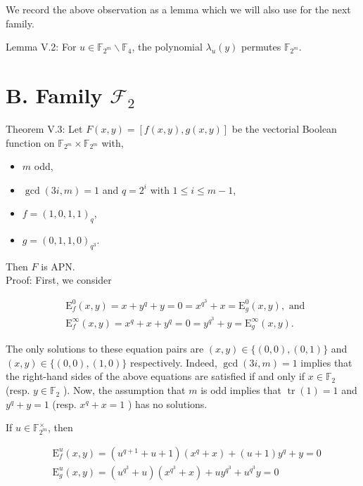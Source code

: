 \documentclass[10pt]{article}
\begin{document}
We record the above observation as a lemma which we will also use for the next family.

Lemma V.2: For $u \in \mathbb{F}_{2^{m}} \backslash \mathbb{F}_{4}$, the polynomial $\lambda_{u}(y)$ permutes $\mathbb{F}_{2^{m}}$.

\section*{B. Family $\mathcal{F}_{2}$}
Theorem V.3: Let $F(x, y)=[f(x, y), g(x, y)]$ be the vectorial Boolean function on $\mathbb{F}_{2^{m}} \times \mathbb{F}_{2^{m}}$ with,

\begin{itemize}
  \item $m$ odd,
  \item $\operatorname{gcd}(3 i, m)=1$ and $q=2^{i}$ with $1 \leq i \leq m-1$,
  \item $f=(1,0,1,1)_{q}$,
  \item $g=(0,1,1,0)_{q^{3}}$.
\end{itemize}

Then $F$ is APN.\\
Proof: First, we consider

$$
\begin{aligned}
& \mathrm{E}_{f}^{0}(x, y)=x+y^{q}+y=0=x^{q^{3}}+x=\mathrm{E}_{g}^{0}(x, y), \text { and } \\
& \mathrm{E}_{f}^{\infty}(x, y)=x^{q}+x+y^{q}=0=y^{q^{3}}+y=\mathrm{E}_{g}^{\infty}(x, y) .
\end{aligned}
$$

The only solutions to these equation pairs are $(x, y) \in \{(0,0),(0,1)\}$ and $(x, y) \in\{(0,0),(1,0)\}$ respectively. Indeed, $\operatorname{gcd}(3 i, m)=1$ implies that the right-hand sides of the above equations are satisfied if and only if $x \in \mathbb{F}_{2}$ (resp. $y \in \mathbb{F}_{2}$ ). Now, the assumption that $m$ is odd implies that $\operatorname{tr}(1)=1$ and $y^{q}+y=1$ (resp. $x^{q}+x=1$ ) has no solutions.

If $u \in \mathbb{F}_{2^{m}}^{\times}$, then

$$
\begin{aligned}
& \mathrm{E}_{f}^{u}(x, y)=\left(u^{q+1}+u+1\right)\left(x^{q}+x\right)+(u+1) y^{q}+y=0 \\
& \mathrm{E}_{g}^{u}(x, y)=\left(u^{q^{3}}+u\right)\left(x^{q^{3}}+x\right)+u y^{q^{3}}+u^{q^{3}} y=0
\end{aligned}
$$
\end{document}
